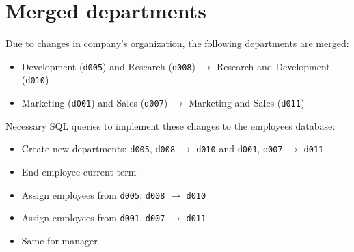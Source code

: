 \documentclass{assignment}
\begin{document}
\section*{Merged departments}
Due to changes in company's organization, the following departments are merged:
\begin{itemize}
    \item Development (\texttt{d005}) and Research (\texttt{d008})
        $\to$ Research and
        Development (\texttt{d010})
    \item Marketing (\texttt{d001}) and Sales (\texttt{d007}) $\to$
        Marketing and Sales (\texttt{d011})
\end{itemize}
Necessary SQL queries to implement these changes to the
employees database:
\begin{itemize}[noitemsep]
    \item Create new departments: \texttt{d005}, \texttt{d008} $\to$
        \texttt{d010} and \texttt{d001}, \texttt{d007} $\to$ \texttt{d011}
        
    \item End employee current term
        
    \item Assign employees from \texttt{d005}, \texttt{d008} $\to$ \texttt{d010}
        
    \item Assign employees from \texttt{d001}, \texttt{d007} $\to$ \texttt{d011}
        
    \item Same for manager
        
\end{itemize}
\end{document}
